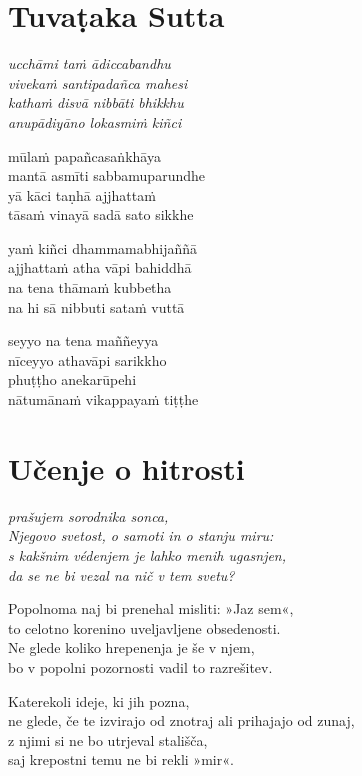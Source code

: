 

\cleartoverso
\chapter*{Tuvaṭaka Sutta}

\emph{ucchāmi taṁ ādiccabandhu\\
vivekaṁ santipadañca mahesi\\
kathaṁ disvā nibbāti bhikkhu\\
anupādiyāno lokasmiṁ kiñci}

mūlaṁ papañcasaṅkhāya\\
mantā asmīti sabbamuparundhe\\
yā kāci taṇhā ajjhattaṁ\\
tāsaṁ vinayā sadā sato sikkhe

yaṁ kiñci dhammamabhijaññā\\
ajjhattaṁ atha vāpi bahiddhā\\
na tena thāmaṁ kubbetha\\
na hi sā nibbuti sataṁ vuttā

seyyo na tena maññeyya\\
nīceyyo athavāpi sarikkho\\
phuṭṭho anekarūpehi\\
nātumānaṁ vikappayaṁ tiṭṭhe


\cleartorecto
\chapter{Učenje o hitrosti}

\emph{prašujem sorodnika sonca,\\
Njegovo svetost, o samoti in o stanju miru:\\
s kakšnim védenjem je lahko menih ugasnjen,\\
da se ne bi vezal na nič v tem svetu?}

Popolnoma naj bi prenehal misliti: »Jaz sem«,\\
to celotno korenino uveljavljene obsedenosti.\\
Ne glede koliko hrepenenja je še v njem,\\
bo v popolni pozornosti vadil to razrešitev.

Katerekoli ideje, ki jih pozna,\\
ne glede, če te izvirajo od znotraj ali prihajajo od zunaj,\\
z njimi si ne bo utrjeval stališča,\\
saj krepostni temu ne bi rekli »mir«.

